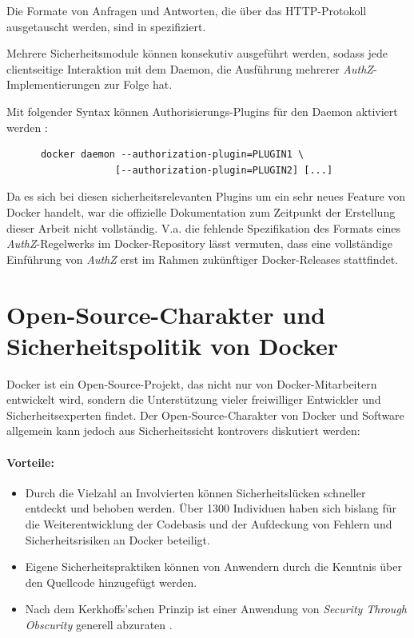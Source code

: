 \documentclass[../main.tex]{subfiles}
\begin{document}
    Die Formate von Anfragen und Antworten, die über das HTTP-Protokoll ausgetauscht werden, sind in \cite{githubAuthZExtended} spezifiziert.

    Mehrere Sicherheitsmodule können konsekutiv ausgeführt werden, sodass jede clientseitige Interaktion mit dem Daemon, die Ausführung mehrerer \emph{AuthZ}-Implementierungen zur Folge hat.

    Mit folgender Syntax können Authorisierungs-Plugins für den Daemon aktiviert werden \cite{githubAuthZExtended}:

    \begin{lstlisting}
      docker daemon --authorization-plugin=PLUGIN1 \
                   [--authorization-plugin=PLUGIN2] [...]
    \end{lstlisting}

    Da es sich bei diesen sicherheitsrelevanten Plugins um ein sehr neues Feature von Docker handelt, war die offizielle Dokumentation zum Zeitpunkt der Erstellung dieser Arbeit nicht vollständig. V.a. die fehlende Spezifikation des Formats eines \emph{AuthZ}-Regelwerks im Docker-Repository lässt vermuten, dass eine vollständige Einführung von \emph{AuthZ} erst im Rahmen zukünftiger Docker-Releases stattfindet.

  \section{Open-Source-Charakter und Sicherheitspolitik von Docker}
    Docker ist ein Open-Source-Projekt, das nicht nur von Docker-Mitarbeitern entwickelt wird, sondern die Unterstützung vieler freiwilliger Entwickler und Sicherheitsexperten findet. Der Open-Source-Charakter von Docker und Software allgemein kann jedoch aus Sicherheitssicht kontrovers diskutiert werden:

    \paragraph{Vorteile:}
    \begin{itemize}
      \item Durch die Vielzahl an Involvierten können Sicherheitslücken schneller entdeckt und behoben werden. Über 1300 Individuen haben sich bislang für die Weiterentwicklung der Codebasis und der Aufdeckung von Fehlern und Sicherheitsrisiken an Docker beteiligt.
      \item Eigene Sicherheitspraktiken können von Anwendern durch die Kenntnis über den Quellcode hinzugefügt werden.
      \item Nach dem Kerkhoffs'schen Prinzip ist einer Anwendung von \emph{Security Through Obscurity} generell abzuraten \cite[S.15]{nist}.
    \end{itemize}
\end{document}
